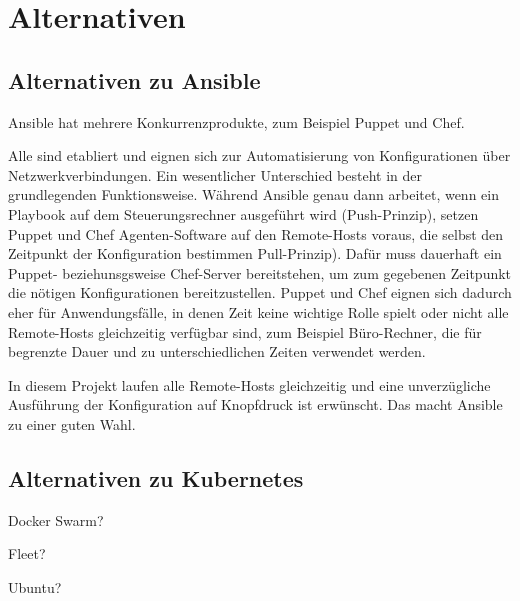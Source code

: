 \chapter{Alternativen}\label{ch:alternativen}
\section{Alternativen zu Ansible}\label{sec:ansible-alternativen}

Ansible hat mehrere Konkurrenzprodukte, zum Beispiel Puppet und Chef.

Alle sind etabliert und eignen sich zur Automatisierung von Konfigurationen über Netzwerkverbindungen.
Ein wesentlicher Unterschied besteht in der grundlegenden Funktionsweise.
Während Ansible genau dann arbeitet, wenn ein Playbook auf dem Steuerungsrechner ausgeführt wird (Push-Prinzip), setzen Puppet und Chef Agenten-Software auf den Remote-Hosts voraus, die selbst den Zeitpunkt der Konfiguration bestimmen Pull-Prinzip).
Dafür muss dauerhaft ein Puppet- beziehunsgsweise Chef-Server bereitstehen, um zum gegebenen Zeitpunkt die nötigen Konfigurationen bereitzustellen.
Puppet und Chef eignen sich dadurch eher für Anwendungsfälle, in denen Zeit keine wichtige Rolle spielt oder nicht alle Remote-Hosts gleichzeitig verfügbar sind, zum Beispiel Büro-Rechner, die für begrenzte Dauer und zu unterschiedlichen Zeiten verwendet werden.

In diesem Projekt laufen alle Remote-Hosts gleichzeitig und eine unverzügliche Ausführung der Konfiguration auf Knopfdruck ist erwünscht.
Das macht Ansible zu einer guten Wahl.

\section{Alternativen zu Kubernetes}\label{sec:kubernetes-alternativen}
Docker Swarm?

Fleet?

Ubuntu?